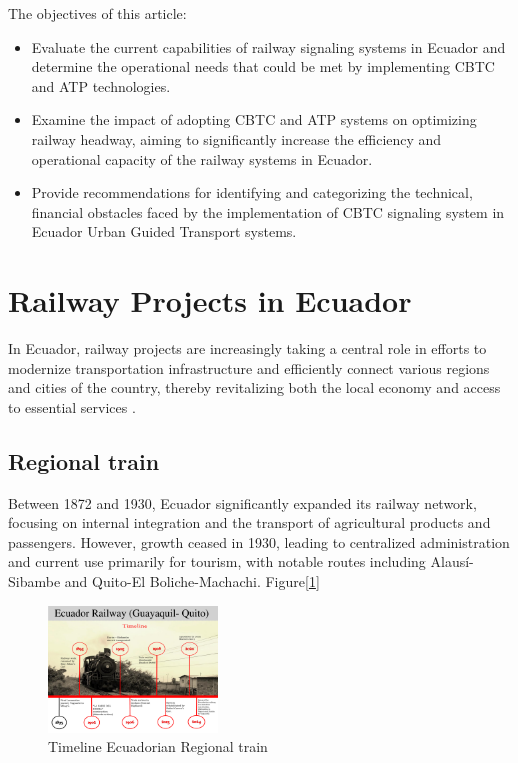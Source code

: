 \documentclass[conference]{IEEEtran}
\begin{document}
The objectives of this article:
\begin{itemize}
\item Evaluate the current capabilities of railway signaling systems in Ecuador and determine the operational needs that could be met by implementing CBTC and ATP technologies.
\item Examine the impact of adopting CBTC and ATP systems on optimizing railway headway, aiming to significantly increase the efficiency and operational capacity of the railway systems in Ecuador.
\item Provide recommendations for identifying and categorizing the technical, financial obstacles faced by the implementation of CBTC signaling system in Ecuador Urban Guided Transport systems.
\end{itemize}


\section{Railway Projects in Ecuador}

In Ecuador, railway projects are increasingly taking a central role in efforts to modernize transportation infrastructure and efficiently connect various regions and cities of the country, thereby revitalizing both the local economy and access to essential services \cite{b2}. 

\subsection{Regional train}

Between 1872 and 1930, Ecuador significantly expanded its railway network, focusing on internal integration and the transport of agricultural products and passengers. However, growth ceased in 1930, leading to centralized administration and current use primarily for tourism, with notable routes including Alausí-Sibambe and Quito-El Boliche-Machachi. Figure[\ref{fig:timeline_train_reg}]
\begin{figure}[htbp]
    \centering
    \includegraphics[width=0.4\textwidth]{Imagenes_general/Timeline railway Guayaquil - Quito_1.pdf}
    \caption{Timeline Ecuadorian Regional train}
    \label{fig:timeline_train_reg}
\end{figure}
\end{document}
